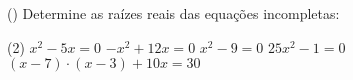 \begin{question} () %
Determine as raízes reais das equações incompletas:

\begin{tasks}(2)
        \task $x^2-5x=0$
        \task $-x^2+12x=0$
        \task $x^2-9=0$
        \task $25x^2-1=0$
        \task $(x-7) \cdot (x-3)+10x=30$
    \end{tasks}
\end{question}
